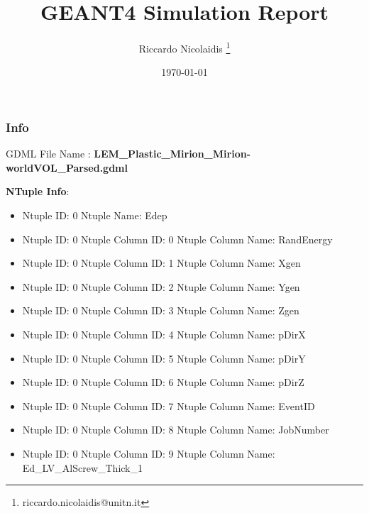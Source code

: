 \documentclass[8pt]{beamer}
\title{GEANT4 Simulation Report}
\author{Riccardo Nicolaidis \footnote{riccardo.nicolaidis@unitn.it}}
\date{\today}
\begin{document}
        
            \begin{frame}
                \titlepage
            \end{frame}
            
            \begin{frame}
                \frametitle{Info}
            
                \centering
                GDML File Name : \textbf{ LEM\_Plastic\_Mirion\_Mirion-worldVOL\_Parsed.gdml}
                
                
                \vspace{2 cm}
                \textbf{NTuple Info}:
                \vspace{1 cm}
                
        \begin{itemize}
        
        \item Ntuple ID: 0 Ntuple Name: Edep
        
        \item Ntuple ID: 0 Ntuple Column ID: 0 Ntuple Column Name: RandEnergy
        
        \item Ntuple ID: 0 Ntuple Column ID: 1 Ntuple Column Name: Xgen
        
        \item Ntuple ID: 0 Ntuple Column ID: 2 Ntuple Column Name: Ygen
        
        \item Ntuple ID: 0 Ntuple Column ID: 3 Ntuple Column Name: Zgen
        
        \item Ntuple ID: 0 Ntuple Column ID: 4 Ntuple Column Name: pDirX
        
        \item Ntuple ID: 0 Ntuple Column ID: 5 Ntuple Column Name: pDirY
        
        \item Ntuple ID: 0 Ntuple Column ID: 6 Ntuple Column Name: pDirZ
        
        \item Ntuple ID: 0 Ntuple Column ID: 7 Ntuple Column Name: EventID
        
        \item Ntuple ID: 0 Ntuple Column ID: 8 Ntuple Column Name: JobNumber
        
        \item Ntuple ID: 0 Ntuple Column ID: 9 Ntuple Column Name: Ed\_LV\_AlScrew\_Thick\_1
        

\end{itemize}
\end{frame}
\end{document}
